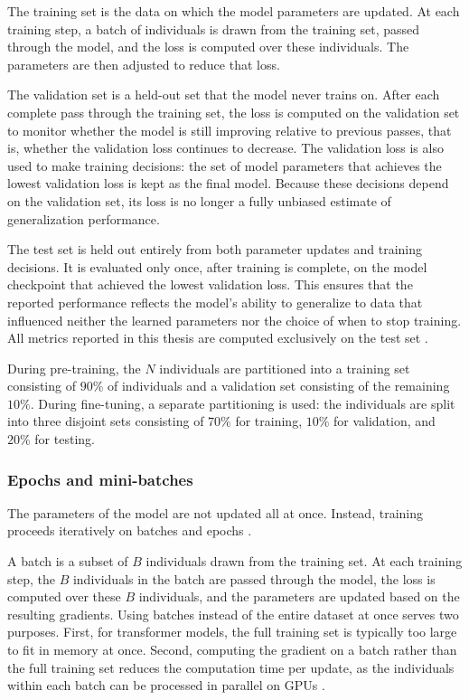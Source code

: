 The training set is the data on which the model parameters are
updated. At each training step, a batch of individuals is drawn from the
training set, passed through the model, and the loss is computed over these
individuals. The parameters are then adjusted to reduce that loss.

The validation set is a held-out set that the model never trains
on. After each complete pass through the training set, the loss is computed
on the validation set to monitor whether the model is still improving
relative to previous passes, that is, whether the validation loss continues
to decrease. The validation loss is also used to make training decisions:
the set of model parameters that achieves the lowest validation loss is kept
as the final model. Because these decisions depend on the validation set,
its loss is no longer a fully unbiased estimate of generalization
performance.

The test set is held out entirely from both parameter updates and
training decisions. It is evaluated only once, after training is complete,
on the model checkpoint that achieved the lowest validation loss. This
ensures that the reported performance reflects the model's ability to
generalize to data that influenced neither the learned parameters nor the
choice of when to stop training. All metrics reported in this thesis are
computed exclusively on the test set \citep[Sec.~7.2]{Hastie2009}.

During pre-training, the $N$ individuals are partitioned into a training set
consisting of $90\%$ of individuals and a validation set consisting of the
remaining $10\%$. During fine-tuning, a separate partitioning is used: the
individuals are split into three disjoint sets consisting of $70\%$ for
training, $10\%$ for validation, and $20\%$ for testing.

\subsubsection{Epochs and mini-batches}
The parameters of the model are not updated all at once. Instead, training
proceeds iteratively on batches and epochs \citep{Goodfellow2016}.

A batch is a subset of $B$ individuals drawn from the training set. At each
training step, the $B$ individuals in the batch are passed through the
model, the loss is computed over these $B$ individuals, and the parameters
are updated based on the resulting gradients. Using batches instead of the
entire dataset at once serves two purposes. First, for transformer models,
the full training set is typically too large to fit in memory at once.
Second, computing the gradient on a batch rather than the full training set
reduces the computation time per update, as the individuals within each
batch can be processed in parallel on GPUs
\citep[Sec.~8.1]{Goodfellow2016}.

